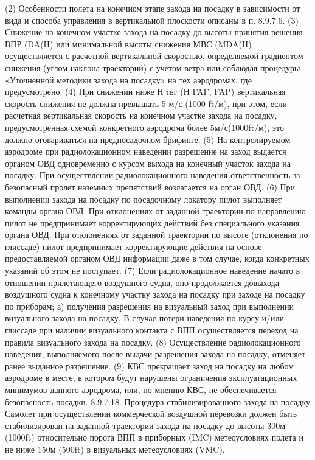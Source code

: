 (2) Особенности полета на конечном этапе захода на посадку в зависимости от вида и способа управления в вертикальной плоскости описаны в п. 8.9.7.6.
(3) Снижение на конечном участке захода на посадку до высоты принятия решения ВПР (DA(H) или минимальной высоты снижения МВС (MDA(H) осуществляется с расчетной вертикальной скоростью, определяемой градиентом снижения (углом наклона траектории) с учетом ветра или соблюдая процедуры «Уточненной методики захода на посадку» на тех аэродромах, где предусмотрено.
(4) При снижении ниже Н твг (Н FAF, FAP) вертикальная скорость снижения не должна превышать 5 м/с (1000 ft/м), при этом, если расчетная вертикальная скорость на конечном участке захода на посадку, предусмотренная схемой конкретного аэродрома более 5м/с(1000ft/м), это должно оговариваться на предпосадочном брифинге.
(5) На контролируемом аэродроме при радиолокационном наведении разрешение на заход выдается органом ОВД одновременно с курсом выхода на конечный участок захода на посадку.
При осуществлении радиолокационного наведения ответственность за безопасный пролет наземных препятствий возлагается на орган ОВД.
(6) При выполнении захода на посадку по посадочному локатору пилот выполняет команды органа ОВД.
При отклонениях от заданной траектории по направлению пилот не предпринимает корректирующих действий без специального указания органа ОВД.
При отклонениях от заданной траектории по высоте (отклонения по глиссаде) пилот предпринимает корректирующие действия на основе предоставляемой органом ОВД информации даже в том случае, когда конкретных указаний об этом не поступает.
(7) Если радиолокационное наведение начато в отношении прилетающего воздушного судна, оно продолжается довыхода воздушного судна к конечному участку захода на посадку при заходе на посадку по приборам;
а)	получения разрешения на визуальный заход при выполнении визуального захода на посадку.
В случае потери наведения по курсу и/или глиссаде при наличии визуального контакта с ВПП осуществляется переход на правила визуального захода на посадку.
(8) Осуществление радиолокационного наведения, выполняемого после выдачи разрешения захода на посадку, отменяет ранее выданное разрешение.
(9) КВС прекращает заход на посадку на любом аэродроме в месте, в котором будут нарушены ограничения эксплуатационных минимумов данного аэродрома, или, по мнению КВС, не обеспечивается безопасность посадки.
8.9.7.18.	Процедура стабилизированного захода на посадку
Самолет при осуществлении коммерческой воздушной перевозки должен быть стабилизирован на заданной траектории захода на посадку до высоты 300м (1000ft) относительно порога ВПП в приборных (IMC) метеоусловиях полета и не ниже 150м (500ft) в визуальных метеоусловиях (VMC).
